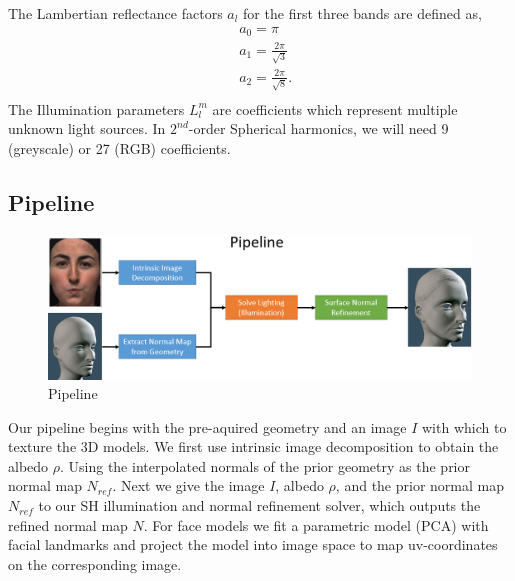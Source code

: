\documentclass[10pt,twocolumn,letterpaper]{article}
\begin{document}
The Lambertian reflectance factors $a_l$ for the first three bands are defined as,
\begin{equation}
\begin{split}
&a_0 = \pi\\
&a_1 = \frac{2\pi}{\sqrt{3}}\\
&a_2 = \frac{2\pi}{\sqrt{8}}.\\
\end{split}
\end{equation}
The Illumination parameters $L_l^m$ are coefficients which represent multiple unknown light sources. In $2^{nd}$-order Spherical harmonics, we will need 9 (greyscale) or 27 (RGB) coefficients.

\subsection{Pipeline} 
\begin{figure}[!h]
    \begin{center}
        \includegraphics [scale=0.35] {image/pipeline.png}
    \end{center}
    \caption{Pipeline}
    \label{fig:pipe1}
\end{figure} 
Our pipeline begins with the pre-aquired geometry and an image $I$ with which to texture the 3D models. We first use intrinsic image decomposition to obtain the albedo $\rho$. Using the interpolated normals of the prior geometry as the prior normal map $N_{ref}$. Next we give the image $I$, albedo $\rho$, and the prior normal map $N_{ref}$ to our SH illumination and normal refinement solver, which outputs the refined normal map $N$. For face models we fit a parametric model (PCA) with facial landmarks\cite{pca} and project the model into image space to map uv-coordinates on the corresponding image.
\end{document}
